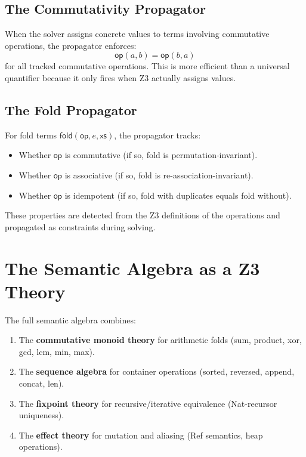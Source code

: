 \documentclass[11pt,a4paper]{report}
\theoremstyle{definition}
\theoremstyle{plain}
\newcommand{\fold}{\mathsf{fold}}
\newcommand{\op}{\mathsf{op}}
\begin{document}
\subsection{The Commutativity Propagator}

When the solver assigns concrete values to terms involving commutative
operations, the propagator enforces:
\[
  \mathsf{op}(a, b) = \mathsf{op}(b, a)
\]
for all tracked commutative operations.  This is more efficient than
a universal quantifier because it only fires when Z3 actually assigns
values.

\subsection{The Fold Propagator}

For fold terms $\fold(\op, e, \mathsf{xs})$, the propagator tracks:
\begin{itemize}
  \item Whether $\op$ is commutative (if so, fold is
    permutation-invariant).
  \item Whether $\op$ is associative (if so, fold is
    re-association-invariant).
  \item Whether $\op$ is idempotent (if so, fold with duplicates
    equals fold without).
\end{itemize}

These properties are detected from the Z3 definitions of the
operations and propagated as constraints during solving.

\section{The Semantic Algebra as a Z3 Theory}

The full semantic algebra combines:

\begin{enumerate}
  \item The \textbf{commutative monoid theory} for arithmetic folds
    (sum, product, xor, gcd, lcm, min, max).
  \item The \textbf{sequence algebra} for container operations
    (sorted, reversed, append, concat, len).
  \item The \textbf{fixpoint theory} for recursive/iterative
    equivalence (Nat-recursor uniqueness).
  \item The \textbf{effect theory} for mutation and aliasing
    (Ref semantics, heap operations).
\end{enumerate}
\end{document}
